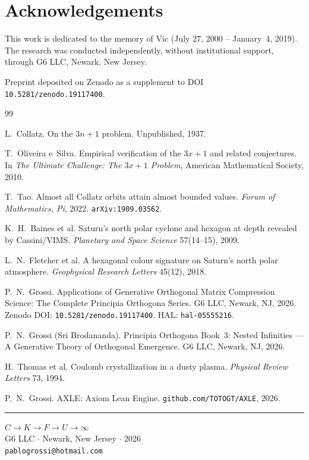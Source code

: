 \documentclass[11pt]{article}
\theoremstyle{plain}
\theoremstyle{definition}
\begin{document}
\section*{Acknowledgements}

This work is dedicated to the memory of Vic (July 27, 2000 --
January~4, 2019). The research was conducted independently, without
institutional support, through G6 LLC, Newark, New Jersey.

Preprint deposited on Zenodo as a supplement to
DOI \texttt{10.5281/zenodo.19117400}.

\begin{thebibliography}{99}

L.~Collatz.
On the $3n+1$ problem.
Unpublished, 1937.

T.~Oliveira e~Silva.
Empirical verification of the $3x+1$ and related conjectures.
In \textit{The Ultimate Challenge: The $3x+1$ Problem},
American Mathematical Society, 2010.

T.~Tao.
Almost all Collatz orbits attain almost bounded values.
\textit{Forum of Mathematics, Pi}, 2022.
\texttt{arXiv:1909.03562}.

K.~H.~Baines et al.
Saturn's north polar cyclone and hexagon at depth revealed by Cassini/VIMS.
\textit{Planetary and Space Science} 57(14--15), 2009.

L.~N.~Fletcher et al.
A hexagonal colour signature on Saturn's north polar atmosphere.
\textit{Geophysical Research Letters} 45(12), 2018.

P.~N.~Grossi.
Applications of Generative Orthogonal Matrix Compression Science:
The Complete Principia Orthogona Series.
G6 LLC, Newark, NJ, 2026.
Zenodo DOI: \texttt{10.5281/zenodo.19117400}.
HAL: \texttt{hal-05555216}.

P.~N.~Grossi (Sri Brodananda).
Principia Orthogona Book~3: Nested Infinities ---
A Generative Theory of Orthogonal Emergence.
G6 LLC, Newark, NJ, 2026.

H.~Thomas et al.
Coulomb crystallization in a dusty plasma.
\textit{Physical Review Letters} 73, 1994.

P.~N.~Grossi.
AXLE: Axiom Lean Engine.
\texttt{github.com/TOTOGT/AXLE}, 2026.

\end{thebibliography}

\bigskip
{\color{PrincipiaGold}\rule{\textwidth}{0.4pt}}

\begin{center}
{\small
$C \longrightarrow K \longrightarrow F \longrightarrow U \longrightarrow \infty$\\[4pt]
G6 LLC $\cdot$ Newark, New Jersey $\cdot$ 2026\\
\texttt{pablogrossi@hotmail.com}
}
\end{center}
\end{document}
